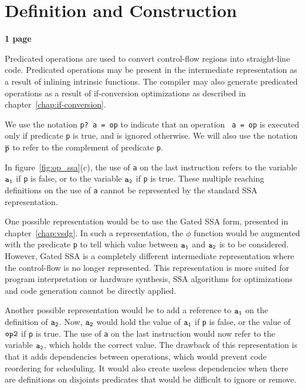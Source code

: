 \section{Definition and Construction}

\textbf{1 page}


Predicated operations are used to convert control-flow regions into
straight-line code. Predicated operations may be present in the intermediate
representation as a result of inlining intrinsic functions. The compiler may
also generate predicated operations as a result of if-conversion optimizations
as described in chapter~\ref{chap:if-conversion}.

We use the notation {\tt p? a = op} to indicate that an operation {\tt
  a = op} is executed only if predicate {\tt p} is true, and is
ignored otherwise. We will also use the notation ${\tt \overline{p}}$
to refer to the complement of predicate {\tt p}.

In figure~\ref{fig:op_ssa}(c), the use of {\tt a} on the last
instruction refers to the variable ${\tt a_1}$ if {\tt p} is false, or
to the variable ${\tt a_2}$ if {\tt p} is true. These multiple
reaching definitions on the use of {\tt a} cannot be represented by
the standard SSA representation.

One possible representation would be to use the Gated SSA form,
presented in chapter~\ref{chap:vsdg}. In such a representation, the
$\phi$ function would be augmented with the predicate {\tt p} to tell
which value between ${\tt a_1}$ and ${\tt a_2}$ is to be
considered. However, Gated SSA is a completely different intermediate
representation where the control-flow is no longer represented. This
representation is more suited for program interpretation or hardware
synthesis, SSA algorithms for optimizations and code generation cannot
be directly applied.

Another possible representation would be to add a reference to ${\tt
  a_1}$ on the definition of ${\tt a_2}$. Now, ${\tt a_2}$ would hold
the value of ${\tt a_1}$ if {\tt p} is false, or the value of ${\tt
  op2}$ if {\tt p} is true. The use of {\tt a} on the last instruction
would now refer to the variable ${\tt a_2}$, which holds the correct
value. The drawback of this representation is that it adds
dependencies between operations, which would prevent code reordering
for scheduling. It would also create useless dependencies when there
are definitions on disjoints predicates that would be difficult to
ignore or remove.

